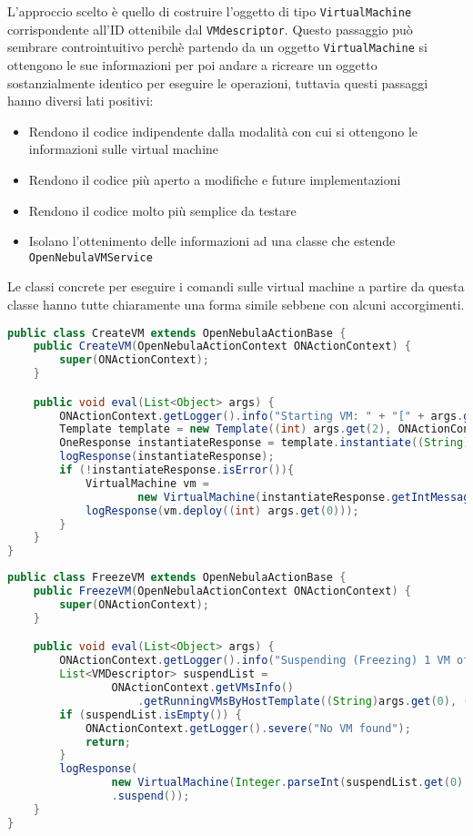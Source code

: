 L'approccio scelto è quello di costruire l'oggetto di tipo \texttt{VirtualMachine} corrispondente all'ID ottenibile dal \texttt{VMdescriptor}. Questo passaggio può sembrare controintuitivo perchè partendo da un oggetto \texttt{VirtualMachine} si ottengono le sue informazioni per poi andare a ricreare un oggetto sostanzialmente identico per eseguire le operazioni, tuttavia questi passaggi hanno diversi lati positivi:
\begin{itemize}
    \item Rendono il codice indipendente dalla modalità con cui si ottengono le informazioni sulle virtual machine
    \item Rendono il codice più aperto a modifiche e future implementazioni
    \item Rendono il codice molto più semplice da testare
    \item Isolano l'ottenimento delle informazioni ad una classe che estende \texttt{OpenNebulaVMService}
\end{itemize}
Le classi concrete per eseguire i comandi sulle virtual machine a partire da questa classe hanno tutte chiaramente una forma simile sebbene con alcuni accorgimenti.
\begin{lstlisting}[language=Java, caption=Classe per avviare una \texttt{VirtualMachine}, label=code:CreateVM, basicstyle=\fontsize{8.5}{9.5}\ttfamily]
public class CreateVM extends OpenNebulaActionBase {
	public CreateVM(OpenNebulaActionContext ONActionContext) {
		super(ONActionContext);
	}

	public void eval(List<Object> args) {
		ONActionContext.getLogger().info("Starting VM: " + "[" + args.get(2) + ", " + args.get(1) + "]");
		Template template = new Template((int) args.get(2), ONActionContext.getClient());
		OneResponse instantiateResponse = template.instantiate((String) args.get(1));
		logResponse(instantiateResponse);
		if (!instantiateResponse.isError()){
			VirtualMachine vm = 
					new VirtualMachine(instantiateResponse.getIntMessage(), ONActionContext.getClient());
			logResponse(vm.deploy((int) args.get(0)));
		}		
	}
}
\end{lstlisting}
\begin{lstlisting}[language=Java, caption=Classe per freezzare(sospendere) una \texttt{VirtualMachine}, label=code:FreezeVM, basicstyle=\fontsize{8.5}{9.5}\ttfamily]
public class FreezeVM extends OpenNebulaActionBase {
	public FreezeVM(OpenNebulaActionContext ONActionContext) {
		super(ONActionContext);
	}

	public void eval(List<Object> args) {
		ONActionContext.getLogger().info("Suspending (Freezing) 1 VM of [host, template]: " + "[" + args.get(0) + " " + args.get(2) + "]");
		List<VMDescriptor> suspendList = 
				ONActionContext.getVMsInfo()
                    .getRunningVMsByHostTemplate((String)args.get(0), (String)args.get(2));
		if (suspendList.isEmpty()) {
			ONActionContext.getLogger().severe("No VM found");
            return;
        }
		logResponse(
				new VirtualMachine(Integer.parseInt(suspendList.get(0).getVmId()), ONActionContext.getClient())
				.suspend());
	}
}
\end{lstlisting}

